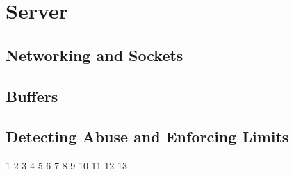 \section{Server}

\subsection{Networking and Sockets}

\subsection{Buffers}

\subsection{Detecting Abuse and Enforcing Limits}
1
2
3
4
5
6
7
8
9
10
11
12
13
